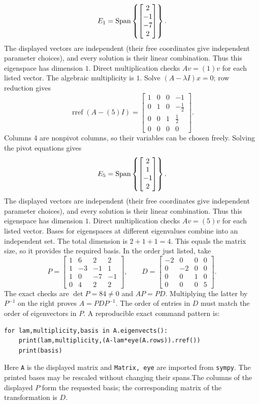\[E_{1}=\operatorname{Span}\left\{\begin{bmatrix}2\\-1\\-7\\2\end{bmatrix}\right\}.\]
The displayed vectors are independent (their free coordinates give independent parameter choices), and every solution is their linear combination. Thus this eigenspace has dimension $1$. Direct multiplication checks $Av=(1)v$ for each listed vector.
The algebraic multiplicity is $1$. Solve $(A-\lambda I)x=0$; row reduction gives
\[\operatorname{rref}(A-(5)I)=\begin{bmatrix}1&0&0&-1\\0&1&0&- \frac{1}{2}\\0&0&1&\frac{1}{2}\\0&0&0&0\end{bmatrix}.\]
Columns 4 are nonpivot columns, so their variables can be chosen freely. Solving the pivot equations gives
\[E_{5}=\operatorname{Span}\left\{\begin{bmatrix}2\\1\\-1\\2\end{bmatrix}\right\}.\]
The displayed vectors are independent (their free coordinates give independent parameter choices), and every solution is their linear combination. Thus this eigenspace has dimension $1$. Direct multiplication checks $Av=(5)v$ for each listed vector.
Bases for eigenspaces at different eigenvalues combine into an independent set. The total dimension is $2+1+1=4$.
This equals the matrix size, so it provides the required basis. In the order just listed, take
\[P=\begin{bmatrix}1&6&2&2\\1&-3&-1&1\\1&0&-7&-1\\0&4&2&2\end{bmatrix},\qquad D=\begin{bmatrix}-2&0&0&0\\0&-2&0&0\\0&0&1&0\\0&0&0&5\end{bmatrix}.\]
The exact checks are $\det P=84\ne0$ and $AP=PD$. Multiplying the latter by $P^{-1}$ on the right proves $A=PDP^{-1}$. The order of entries in $D$ must match the order of eigenvectors in $P$.
A reproducible exact command pattern is:
\begin{verbatim}
for lam,multiplicity,basis in A.eigenvects():
    print(lam,multiplicity,(A-lam*eye(A.rows)).rref())
    print(basis)
\end{verbatim}
Here \texttt{A} is the displayed matrix and \texttt{Matrix, eye} are imported from \texttt{sympy}. The printed bases may be rescaled without changing their spans.The columns of the displayed $P$ form the requested basis; the corresponding matrix of the transformation is $D$.

